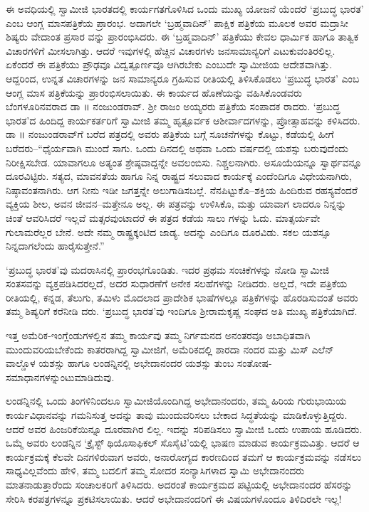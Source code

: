 ಈ ಅವಧಿಯಲ್ಲಿ ಸ್ವಾಮೀಜಿ ಭಾರತದಲ್ಲಿ ಕಾರ್ಯಗತಗೊಳಿಸಿದ ಒಂದು ಮುಖ್ಯ ಯೋಜನೆ ಯೆಂದರೆ ‘ಪ್ರಬುದ್ಧ ಭಾರತ’ ಎಂಬ ಆಂಗ್ಲ ಮಾಸಪತ್ರಿಕೆಯ ಪ್ರಾರಂಭ. ಅದಾಗಲೇ ‘ಬ್ರಹ್ಮವಾದಿನ್​’ ಪಾಕ್ಷಿಕ ಪತ್ರಿಕೆಯ ಮೂಲಕ ಅವರ ಮದ್ರಾಸೀ ಶಿಷ್ಯರು ವೇದಾಂತ ಪ್ರಸಾರ ವನ್ನು ಪ್ರಾರಂಭಿಸಿದರು. ಈ ‘ಬ್ರಹ್ಮವಾದಿನ್​’ ಪತ್ರಿಕೆಯು ಕೇವಲ ಧಾರ್ಮಿಕ ಹಾಗೂ ತಾತ್ವಿಕ ವಿಚಾರಗಳಿಗೆ ಮೀಸಲಾಗಿತ್ತು. ಆದರೆ ಇವುಗಳಲ್ಲಿ ಹೆಚ್ಚಿನ ವಿಚಾರಗಳು ಜನಸಾಮಾನ್ಯರಿಗೆ ಎಟುಕುವಂತಿರಲಿಲ್ಲ. ಏಕೆಂದರೆ ಈ ಪತ್ರಿಕೆಯು ಪ್ರೌಢವೂ ವಿದ್ವತ್ಪೂರ್ಣವೂ ಆಗಿರಬೇಕು ಎಂಬುದೇ ಸ್ವಾಮೀಜಿಯ ಆದೇಶವಾಗಿತ್ತು. ಆದ್ದರಿಂದ, ಉನ್ನತ ವಿಚಾರಗಳನ್ನು ಜನ ಸಾಮಾನ್ಯರೂ ಗ್ರಹಿಸುವ ರೀತಿಯಲ್ಲಿ ತಿಳಿಸಿಕೊಡಲು ‘ಪ್ರಬುದ್ಧ ಭಾರತ’ ಎಂಬ ಆಂಗ್ಲ ಮಾಸ ಪತ್ರಿಕೆಯನ್ನು ಪ್ರಾರಂಭಿಸಲಾಯಿತು. ಈ ಕಾರ್ಯದ ಹೊಣೆಯನ್ನು ವಹಿಸಿಕೊಂಡವರು ಬೆಂಗಳೂರಿನವರಾದ ಡಾ ॥ ನಂಜುಂಡರಾವ್. ಶ್ರೀ ರಾಜಂ ಅಯ್ಯರರು ಪತ್ರಿಕೆಯ ಸಂಪಾದಕ ರಾದರು. ‘ಪ್ರಬುದ್ಧ ಭಾರತ’ದ ಹಿಂದಿದ್ದ ಕಾರ್ಯಕರ್ತರಿಗೆ ಸ್ವಾಮೀಜಿ ತಮ್ಮ ಹೃತ್ಪೂರ್ವಕ ಆಶೀರ್ವಾದಗಳನ್ನು, ಪ್ರೋತ್ಸಾಹವನ್ನು ಕಳಿಸಿದರು. ಡಾ ॥ ನಂಜುಂಡರಾವ್​ಗೆ ಬರೆದ ಪತ್ರದಲ್ಲಿ ಅವರು ಪತ್ರಿಕೆಯ ಬಗ್ಗೆ ಸೂಚನೆಗಳನ್ನು ಕೊಟ್ಟು, ಕಡೆಯಲ್ಲಿ ಹೀಗೆ ಬರೆದರು–“ಧೈರ್ಯವಾಗಿ ಮುಂದೆ ಸಾಗು. ಒಂದು ದಿನದಲ್ಲಿ ಅಥವಾ ಒಂದು ವರ್ಷದಲ್ಲಿ ಯಶಸ್ಸು ಬರುವುದೆಂದು ನಿರೀಕ್ಷಿಸಬೇಡ. ಯಾವಾಗಲೂ ಅತ್ಯಂತ ಶ್ರೇಷ್ಠವಾದ್ದನ್ನೇ ಅವಲಂಬಿಸು. ನಿಶ್ಚಲನಾಗಿರು. ಅಸೂಯೆಯನ್ನೂ ಸ್ವಾರ್ಥವನ್ನೂ ದೂರವಿಟ್ಟಿರು. ಸತ್ಯದ, ಮಾವನತೆಯ ಹಾಗೂ ನಿನ್ನ ರಾಷ್ಟ್ರದ ಸಲುವಾದ ಕಾರ್ಯಕ್ಕೆ ಎಂದೆಂದಿಗೂ ವಿಧೇಯನಾಗಿರು, ನಿಷ್ಠಾವಂತನಾಗಿರು. ಆಗ ನೀನು ಇಡೀ ಜಗತ್ತನ್ನೇ ಅಲುಗಾಡಿಸಬಲ್ಲೆ. ನೆನಪಿಟ್ಟುಕೊ–ಶಕ್ತಿಯ ಹಿಂದಿರುವ ರಹಸ್ಯವೆಂದರೆ ವ್ಯಕ್ತಿಯ ಶೀಲ, ಅವನ ಜೀವನ–ಮತ್ತೇನೂ ಅಲ್ಲ. ಈ ಪತ್ರವನ್ನು ಉಳಿಸಿಕೊ, ಮತ್ತು ಯಾವಾಗ ಲಾದರೂ ನಿನ್ನನ್ನು ಚಿಂತೆ ಆವರಿಸಿದರೆ ಇಲ್ಲವೆ ಮತ್ಸರವುಂಟಾದರೆ ಈ ಪತ್ರದ ಕಡೆಯ ಸಾಲು ಗಳನ್ನು ಓದು. ಮಾತ್ಸರ್ಯವೇ ಗುಲಾಮರೆಲ್ಲರ ಬೇನೆ. ಅದೇ ನಮ್ಮ ರಾಷ್ಟ್ರಕ್ಕಂಟಿದ ಜಾಡ್ಯ. ಅದನ್ನು ಎಂದಿಗೂ ದೂರವಿಡು. ಸಕಲ ಯಶಸ್ಸೂ ನಿನ್ನದಾಗಲೆಂದು ಹಾರೈಸುತ್ತೇನೆ.”

‘ಪ್ರಬುದ್ಧ ಭಾರತ’ವು ಮದರಾಸಿನಲ್ಲಿ ಪ್ರಾರಂಭಗೊಂಡಿತು. ಇದರ ಪ್ರಥಮ ಸಂಚಿಕೆಗಳನ್ನು ನೋಡಿ ಸ್ವಾಮೀಜಿ ಸಂತಸವನ್ನು ವ್ಯಕ್ತಪಡಿಸಿದರಲ್ಲದೆ, ಅದರ ಸುಧಾರಣೆಗೆ ಅನೇಕ ಸಲಹೆಗಳನ್ನು ನೀಡಿದರು. ಅಲ್ಲದೆ, ಇದೇ ಪತ್ರಿಕೆಯ ರೀತಿಯಲ್ಲಿ, ಕನ್ನಡ, ತೆಲುಗು, ತಮಿಳು ಮೊದಲಾದ ಪ್ರಾದೇಶಿಕ ಭಾಷೆಗಳಲ್ಲೂ ಪತ್ರಿಕೆಗಳನ್ನು ಹೊರಡಿಸುವಂತೆ ಅವರು ತಮ್ಮ ಶಿಷ್ಯರಿಗೆ ಕರೆನೀಡಿ ದರು. ‘ಪ್ರಬುದ್ಧ ಭಾರತ’ವು ಇಂದಿಗೂ ಶ್ರೀರಾಮಕೃಷ್ಣ ಸಂಘದ ಅತಿ ಮುಖ್ಯ ಪತ್ರಿಕೆಯಾಗಿದೆ.

ಇತ್ತ ಅಮೆರಿಕ-ಇಂಗ್ಲೆಂಡುಗಳಲ್ಲಿನ ತಮ್ಮ ಕಾರ್ಯವು ತಮ್ಮ ನಿರ್ಗಮನದ ಅನಂತರವೂ ಅಬಾಧಿತವಾಗಿ ಮುಂದುವರಿಯಬೇಕೆಂದು ಕಾತರರಾಗಿದ್ದ ಸ್ವಾಮೀಜಿಗೆ, ಅಮೆರಿಕದಲ್ಲಿ ಶಾರದಾ ನಂದರ ಮತ್ತು ಮಿಸ್ ಎಲೆನ್ ವಾಲ್ಡೊಳ ಯಶಸ್ಸು ಹಾಗೂ ಲಂಡನ್ನಿನಲ್ಲಿ ಅಭೇದಾನಂದರ ಯಶಸ್ಸು ತುಂಬ ಸಂತೋಷ-ಸಮಾಧಾನಗಳನ್ನುಂಟುಮಾಡಿದುವು.

ಲಂಡನ್ನಿನಲ್ಲಿ ಒಂದು ತಿಂಗಳಿನಿಂದಲೂ ಸ್ವಾಮೀಜಿಯೊಂದಿಗಿದ್ದ ಅಭೇದಾನಂದರು, ತಮ್ಮ ಹಿರಿಯ ಗುರುಭಾಯಿಯ ಕಾರ್ಯವಿಧಾನವನ್ನು ಗಮನಿಸುತ್ತ ಅದನ್ನು ತಾವು ಮುಂದುವರಿಸಲು ಬೇಕಾದ ಸಿದ್ಧತೆಯನ್ನು ಮಾಡಿಕೊಳ್ಳುತ್ತಿದ್ದರು. ಆದರೆ ಅವರ ಹಿಂಜರಿಕೆಯಿನ್ನೂ ದೂರವಾಗಿರ ಲಿಲ್ಲ. ಇದನ್ನು ಸರಿಪಡಿಸಲು ಸ್ವಾಮೀಜಿ ಒಂದು ಉಪಾಯ ಹೂಡಿದರು. ಒಮ್ಮೆ ಅವರು ಲಂಡನ್ನಿನ ‘ಕ್ರೈಸ್ಟ್ ಥಿಯೊಸಾಫಿಕಲ್ ಸೊಸೈಟಿ’ಯಲ್ಲಿ ಭಾಷಣ ಮಾಡುವ ಕಾರ್ಯಕ್ರಮವಿತ್ತು. ಆದರೆ ಆ ಕಾರ್ಯಕ್ರಮಕ್ಕೆ ಕೆಲವೇ ದಿನಗಳಿರುವಾಗ ಅವರು, ಅನಾರೋಗ್ಯದ ಕಾರಣದಿಂದ ತಮಗೆ ಆ ಕಾರ್ಯಕ್ರಮವನ್ನು ನಡೆಸಲು ಸಾಧ್ಯವಿಲ್ಲವೆಂದು ಹೇಳಿ, ತಮ್ಮ ಬದಲಿಗೆ ತಮ್ಮ ಸೋದರ ಸಂನ್ಯಾಸಿಗಳಾದ ಸ್ವಾಮಿ ಅಭೇದಾನಂದರು ಮಾತನಾಡುತ್ತಾರೆಂದು ಸಂಚಾಲಕರಿಗೆ ತಿಳಿಸಿದರು. ಅದರಂತೆ ಕಾರ್ಯಕ್ರಮದ ಪಟ್ಟಿಯಲ್ಲಿ ಅಭೇದಾನಂದರ ಹೆಸರನ್ನು ಸೇರಿಸಿ ಕರಪತ್ರಗಳನ್ನೂ ಪ್ರಕಟಿಸಲಾಯಿತು. ಆದರೆ ಅಭೇದಾನಂದರಿಗೆ ಈ ವಿಷಯಗಳೊಂದೂ ತಿಳಿದಿರಲೇ ಇಲ್ಲ!

